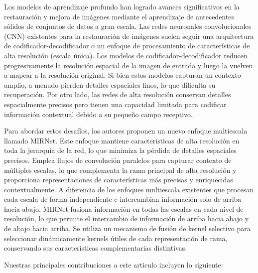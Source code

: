 \documentclass[a4paper,
               ]{jacow}
\begin{document}
Los modelos de aprendizaje profundo han logrado avances significativos en la restauración y mejora de imágenes mediante el aprendizaje de antecedentes sólidos de conjuntos de datos a gran escala. Las redes neuronales convolucionales (CNN) existentes para la restauración de imágenes suelen seguir una arquitectura de codificador-decodificador o un enfoque de procesamiento de características de alta resolución (escala única). Los modelos de codificador-decodificador reducen progresivamente la resolución espacial de la imagen de entrada y luego la vuelven a mapear a la resolución original. Si bien estos modelos capturan un contexto amplio, a menudo pierden detalles espaciales finos, lo que dificulta su recuperación. Por otro lado, las redes de alta resolución conservan detalles espacialmente precisos pero tienen una capacidad limitada para codificar información contextual debido a su pequeño campo receptivo.

Para abordar estos desafíos, los autores proponen un nuevo enfoque multiescala llamado MIRNet. Este enfoque mantiene características de alta resolución en toda la jerarquía de la red, lo que minimiza la pérdida de detalles espaciales precisos. Emplea flujos de convolución paralelos para capturar contexto de múltiples escalas, lo que complementa la rama principal de alta resolución y proporciona representaciones de características más precisas y enriquecidas contextualmente. A diferencia de los enfoques multiescala existentes que procesan cada escala de forma independiente e intercambian información solo de arriba hacia abajo, MIRNet fusiona información en todas las escalas en cada nivel de resolución, lo que permite el intercambio de información de arriba hacia abajo y de abajo hacia arriba. Se utiliza un mecanismo de fusión de kernel selectivo para seleccionar dinámicamente kernels útiles de cada representación de rama, conservando sus características complementarias distintivas.

Nuestras principales contribuciones a este articulo incluyen lo siguiente:
\end{document}
